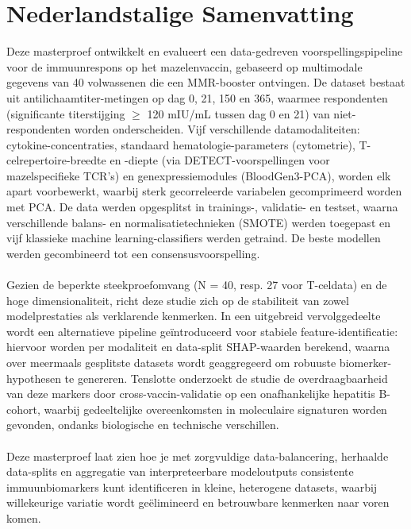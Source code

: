 \documentclass[12pt,a4paper]{report}
\begin{document}
\tableofcontents
\newpage

{}
\listoffigures

{}
\listoftables

{}
\printglossary[type=\acronymtype, title=List of Acronyms, toctitle=List of Acronyms, style=long]

{}
\chapter*{Nederlandstalige Samenvatting}
Deze masterproef ontwikkelt en evalueert een data-gedreven voorspellingspipeline voor de immuunrespons op het mazelenvaccin, gebaseerd op multimodale gegevens van 40 volwassenen die een MMR-booster ontvingen. De dataset bestaat uit antilichaamtiter-metingen op dag 0, 21, 150 en 365, waarmee respondenten (significante titerstijging $\geq$ 120 mIU/mL tussen dag 0 en 21) van niet-respondenten worden onderscheiden. Vijf verschillende datamodaliteiten: cytokine-concentraties, standaard hematologie-parameters (cytometrie), T-celrepertoire-breedte en -diepte (via DETECT-voorspellingen voor mazelspecifieke TCR’s) en genexpressiemodules (BloodGen3-PCA), worden elk apart voorbewerkt, waarbij sterk gecorreleerde variabelen gecomprimeerd worden met PCA. De data werden opgesplitst in trainings-, validatie- en testset, waarna verschillende balans- en normalisatietechnieken (SMOTE) werden toegepast en vijf klassieke machine learning-classifiers werden getraind. De beste modellen werden gecombineerd tot een consensusvoorspelling.\\
\\
Gezien de beperkte steekproefomvang (N = 40, resp. 27 voor T-celdata) en de hoge dimensionaliteit, richt deze studie zich op de stabiliteit van zowel modelprestaties als verklarende kenmerken. In een uitgebreid vervolggedeelte wordt een alternatieve pipeline geïntroduceerd voor stabiele feature-identificatie: hiervoor worden per modaliteit en data-split SHAP-waarden berekend, waarna over meermaals gesplitste datasets wordt geaggregeerd om robuuste biomerker-hypothesen te genereren. Tenslotte onderzoekt de studie de overdraagbaarheid van deze markers door cross-vaccin-validatie op een onafhankelijke hepatitis B-cohort, waarbij gedeeltelijke overeenkomsten in moleculaire signaturen worden gevonden, ondanks biologische en technische verschillen.\\
\\
Deze masterproef laat zien hoe je met zorgvuldige data-balancering, herhaalde data-splits en aggregatie van interpreteerbare modeloutputs consistente immuunbiomarkers kunt identificeren in kleine, heterogene datasets, waarbij willekeurige variatie wordt geëlimineerd en betrouwbare kenmerken naar voren komen.
\end{document}
